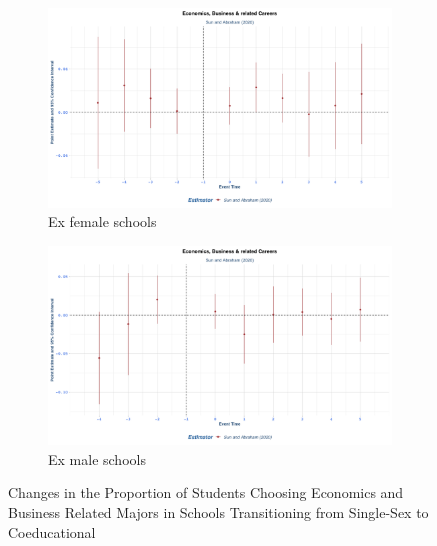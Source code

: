 \begin{figure}[H]
    \centering
    \begin{subfigure}[b]{0.45\textwidth}
        \centering
        \includegraphics[width=\textwidth]{Graph/Results/stagered_ex_females_ECONOMICS_BUSINESS_RELATED.png}
        \caption{Ex female schools }
        \label{fig:staggered_females_economics_business}
    \end{subfigure}
    \hfill
    \begin{subfigure}[b]{0.45\textwidth}
        \centering
        \includegraphics[width=\textwidth]{Graph/Results/stagered_ex_males_ECONOMICS_BUSINESS_RELATED.png}
        \caption{Ex male schools }
        \label{fig:staggered_males_economics_business}
    \end{subfigure}
\caption{ Changes in the Proportion of Students Choosing Economics and Business Related Majors in Schools Transitioning from Single-Sex to Coeducational}
    \label{fig:staggered_economics_business}
\end{figure}

